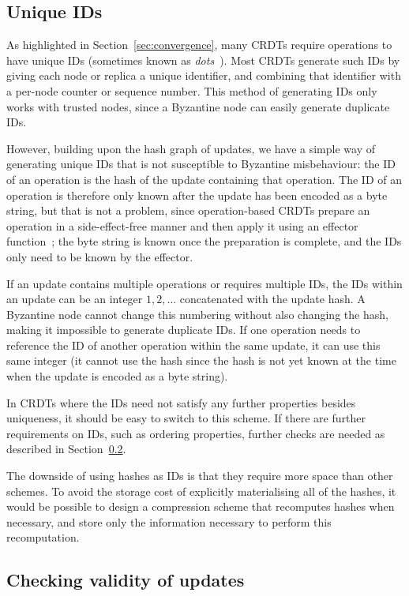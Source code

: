 \documentclass[sigplan,review]{acmart}
\begin{document}
\subsection{Unique IDs}\label{sec:unique-ids}

As highlighted in Section~\ref{sec:convergence}, many CRDTs require operations to have unique IDs (sometimes known as \emph{dots}~\cite{Almeida:2016}).
Most CRDTs generate such IDs by giving each node or replica a unique identifier, and combining that identifier with a per-node counter or sequence number.
This method of generating IDs only works with trusted nodes, since a Byzantine node can easily generate duplicate IDs.

However, building upon the hash graph of updates, we have a simple way of generating unique IDs that is not susceptible to Byzantine misbehaviour: the ID of an operation is the hash of the update containing that operation.
The ID of an operation is therefore only known after the update has been encoded as a byte string, but that is not a problem, since operation-based CRDTs prepare an operation in a side-effect-free manner and then apply it using an effector function~\cite{Shapiro:2011}; the byte string is known once the preparation is complete, and the IDs only need to be known by the effector.

If an update contains multiple operations or requires multiple IDs, the IDs within an update can be an integer $1,2,\dots$ concatenated with the update hash.
A Byzantine node cannot change this numbering without also changing the hash, making it impossible to generate duplicate IDs.
If one operation needs to reference the ID of another operation within the same update, it can use this same integer (it cannot use the hash since the hash is not yet known at the time when the update is encoded as a byte string).

In CRDTs where the IDs need not satisfy any further properties besides uniqueness, it should be easy to switch to this scheme.
If there are further requirements on IDs, such as ordering properties, further checks are needed as described in Section~\ref{sec:check-validity}.

The downside of using hashes as IDs is that they require more space than other schemes.
To avoid the storage cost of explicitly materialising all of the hashes, it would be possible to design a compression scheme that recomputes hashes when necessary, and store only the information necessary to perform this recomputation.

\subsection{Checking validity of updates}\label{sec:check-validity}
\end{document}
